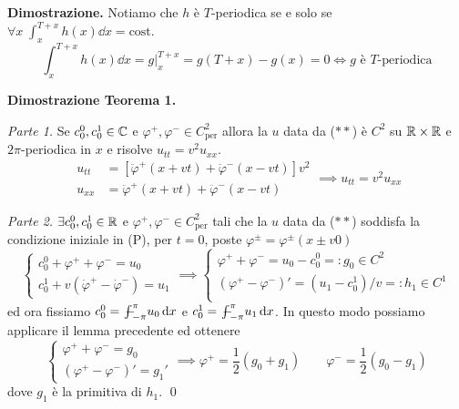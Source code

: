 \textbf{Dimostrazione.}
Notiamo che $h$ è $T$-periodica se e solo se $\forall x \; \int_{x}^{T+x} h(x) \dd x = \text{cost.}$
$$
\int_{x}^{T+x} h(x) \dd x = g \Big|_x^{T+x} = g(T + x) - g(x) = 0 \iff \text{$g$ è $T$-periodica}
$$

\newpage

\textbf{Dimostrazione Teorema 1.}

\textit{Parte 1.}
Se $c_0^0, c_0^1 \in \mathbb C$ e $\varphi^+, \varphi^- \in C^2_\text{per}$ allora la $u$ data da ($**$) è $C^2$ su $\mathbb R \times \mathbb R$ e $2\pi$-periodica in $x$ e risolve $u_{tt} = v^2 u_{xx}$.
$$
\begin{aligned}
	u_{tt} &= [\ddot \varphi^+(x + vt) + \ddot \varphi^-(x - vt)] v^2 \\
	u_{xx} &= \ddot \varphi^+(x + vt) + \ddot \varphi^-(x - vt)
\end{aligned}
\implies u_{tt} = v^2 u_{xx}
$$

\textit{Parte 2.}
$\exists c_0^0, c_0^1 \in \mathbb R$ e $\varphi^+, \varphi^- \in C^2_\text{per}$ tali che la $u$ data da ($**$) soddisfa la condizione iniziale in (P), per $t = 0$, poste $\varphi^\pm = \varphi^\pm(x \pm v0)$
$$
\begin{cases}
	c_0^0 + \varphi^+ + \varphi^- = u_0 \\
	c_0^1 + v(\dot \varphi^+ - \dot \varphi^-) = u_1
\end{cases}
\implies
\begin{cases}
	\varphi^+ + \varphi^- = u_0 - c_0^0 =: g_0 \in C^2 \\
	(\varphi^+ - \varphi^-)' = (u_1 - c_0^1) / v =: h_1 \in C^1 \\
\end{cases}
$$
ed ora fissiamo $c_0^0 = \avint_{-\pi}^\pi u_0 \dd x$ e $c_0^1 = \avint_{-\pi}^\pi u_1 \dd x$. In questo modo possiamo applicare il lemma precedente ed ottenere
$$
\begin{cases}
	\varphi^+ + \varphi^- = g_0 \\
	(\varphi^+ - \varphi^-)' = g_1'
\end{cases}
\implies
\varphi^+ = \frac{1}{2}(g_0 + g_1)
\qquad
\varphi^- = \frac{1}{2}(g_0 - g_1)
$$
dove $g_1$ è la primitiva di $h_1$.
\qed



